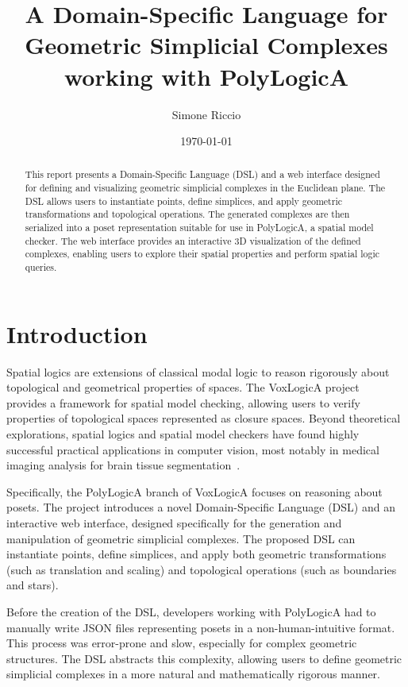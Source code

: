 \documentclass[11pt,a4paper]{article}
\title{A Domain-Specific Language for Geometric Simplicial Complexes working with PolyLogicA}
\author{Simone Riccio}
\date{\today}
\begin{document}
\maketitle

\begin{abstract}
    This report presents a Domain-Specific Language (DSL) and a web interface designed for defining and visualizing geometric simplicial complexes in the Euclidean plane. The DSL allows users to instantiate points, define simplices, and apply geometric transformations and topological operations. The generated complexes are then serialized into a poset representation suitable for use in PolyLogicA, a spatial model checker. The web interface provides an interactive 3D visualization of the defined complexes, enabling users to explore their spatial properties and perform spatial logic queries.
\end{abstract}

\section{Introduction}

Spatial logics are extensions of classical modal logic to reason rigorously about topological and geometrical properties of spaces. The VoxLogicA project~\cite{voxlogica} provides a framework for spatial model checking, allowing users to verify properties of topological spaces represented as closure spaces. Beyond theoretical explorations, spatial logics and spatial model checkers have found highly successful practical applications in computer vision, most notably in medical imaging analysis for brain tissue segmentation~\cite{belmonte2025symbolic}.

Specifically, the PolyLogicA branch of VoxLogicA focuses on reasoning about posets. The project introduces a novel Domain-Specific Language (DSL) and an interactive web interface, designed specifically for the generation and manipulation of geometric simplicial complexes. The proposed DSL can instantiate points, define simplices, and apply both geometric transformations (such as translation and scaling) and topological operations (such as boundaries and stars).

Before the creation of the DSL, developers working with PolyLogicA had to manually write JSON files representing posets in a non-human-intuitive format. This process was error-prone and slow, especially for complex geometric structures. The DSL abstracts this complexity, allowing users to define geometric simplicial complexes in a more natural and mathematically rigorous manner.
\end{document}
